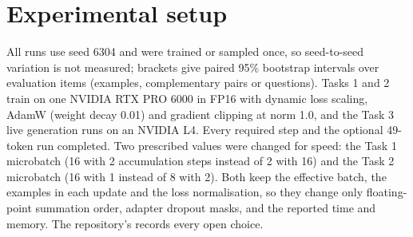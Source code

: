 \section{Experimental setup}
\label{sec:setup}

All runs use seed 6304 and were trained or sampled once, so seed-to-seed variation is not measured; brackets give paired 95\% bootstrap intervals over evaluation items (examples, complementary pairs or questions). Tasks 1 and 2 train on one NVIDIA RTX PRO 6000 in FP16 with dynamic loss scaling, AdamW (weight decay 0.01) and gradient clipping at norm 1.0, and the Task 3 live generation runs on an NVIDIA L4. Every required step and the optional 49-token run completed. Two prescribed values were changed for speed: the Task 1 microbatch (16 with 2 accumulation steps instead of 2 with 16) and the Task 2 microbatch (16 with 1 instead of 8 with 2). Both keep the effective batch, the examples in each update and the loss normalisation, so they change only floating-point summation order, adapter dropout masks, and the reported time and memory. The repository's  records every open choice.
